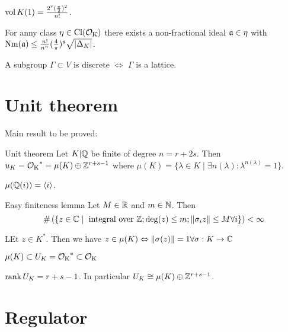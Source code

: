 \documentclass[12pt, a4paper]{article}
\DeclareMathOperator{\Nm}{Nm}
\begin{document}
	\begin{prop}{}{}
		$\vol K(1) = \frac{2^r(\frac{\pi}{2})^2}{n!}$.
	\end{prop}

	\begin{thm}{}{}
		For anny class $\eta \in \Cl(\OK)$ there exists a non-fractional ideal
		$\aa \in \eta$ with $\Nm(\aa) \leq \frac{n!}{n^n}(\frac{4}{\pi})^s
		\sqrt{\abs{\Delta_K}}$. 
	\end{thm}

	\begin{thm}{}{}
		A subgroup $\Gamma \subset V$ is discrete $\iff$ $\Gamma$ is a lattice.
	\end{thm}

	\section{Unit theorem}
	
	Main result to be proved:
	\begin{thm}{Unit theorem}{}
		Let $K \vert \Q$ be finite of degree $n = r + 2s$. Then $u_K = \OK^* 
		= \mu(K) \oplus \Z^{r+s-1}$ where $\mu(K) = \{\lambda \in K 
		\mid \exists n(\lambda) : \lambda^{n(\lambda)} = 1\} $.
	\end{thm}

	\begin{ex}
		$\mu(\Q(i)) = \gen{i}$.
	\end{ex}

	\begin{Lemma}{Easy finiteness lemma}{}
		Let $M \in \R$ and $m \in \N$. Then 
		$$\card {\{z \in \C \mid \text{ integral over } \Z; \deg(z) \leq m 
		; \norm{\sigma_i z} \leq M \forall  i\}} < \infty$$
	\end{Lemma}

	\begin{prop}{}{}
		LEt $z \in K^*$. Then we have 
		$z \in \mu(K) \iff \norm{\sigma(z)} = 1 \forall \sigma: K \to \C$
	\end{prop}

	\begin{rem}
		$\mu(K) \subset U_K = \OK^* \subset \OK$ 
	\end{rem}

	\begin{thm}{}{}
		$\rank U_K = r+s-1$. In particular $U_K \cong \mu(K) \oplus \Z^{r+s-1}$.
	\end{thm}
	
	\section{Regulator}
\end{document}
